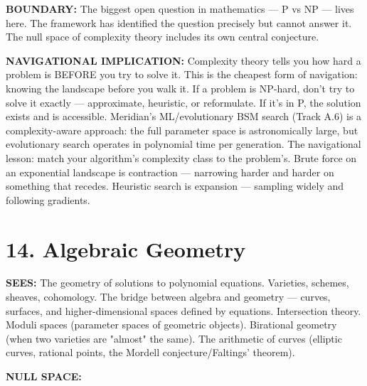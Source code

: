 \textbf{BOUNDARY:} The biggest open question in mathematics — P vs NP — lives here. The framework has identified the question precisely but cannot answer it. The null space of complexity theory includes its own central conjecture.


\textbf{NAVIGATIONAL IMPLICATION:} Complexity theory tells you how hard a problem is BEFORE you try to solve it. This is the cheapest form of navigation: knowing the landscape before you walk it. If a problem is NP-hard, don't try to solve it exactly — approximate, heuristic, or reformulate. If it's in P, the solution exists and is accessible. Meridian's ML/evolutionary BSM search (Track A.6) is a complexity-aware approach: the full parameter space is astronomically large, but evolutionary search operates in polynomial time per generation. The navigational lesson: match your algorithm's complexity class to the problem's. Brute force on an exponential landscape is contraction — narrowing harder and harder on something that recedes. Heuristic search is expansion — sampling widely and following gradients.


\bigskip\noindent\makebox[\textwidth]{\color{rulegray}\rule{5cm}{0.3pt}}\bigskip


\section*{14. Algebraic Geometry}


\textbf{SEES:} The geometry of solutions to polynomial equations. Varieties, schemes, sheaves, cohomology. The bridge between algebra and geometry — curves, surfaces, and higher-dimensional spaces defined by equations. Intersection theory. Moduli spaces (parameter spaces of geometric objects). Birational geometry (when two varieties are "almost" the same). The arithmetic of curves (elliptic curves, rational points, the Mordell conjecture/Faltings' theorem).


\textbf{NULL SPACE:}

